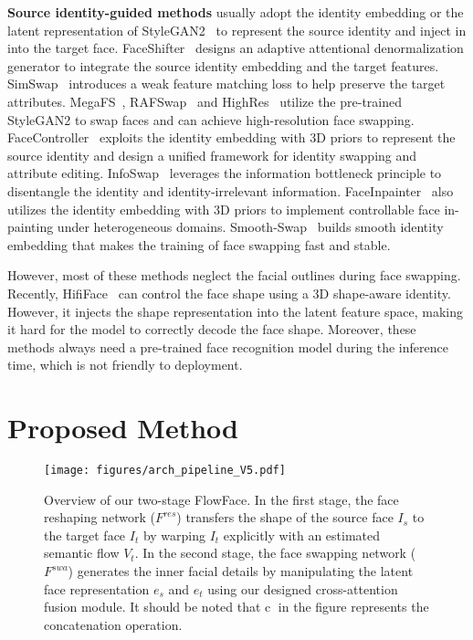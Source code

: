 \textbf{Source identity-guided methods} usually adopt the identity embedding or the latent representation of StyleGAN2~\cite{karras2020analyzing} to represent the source identity and inject in into the target face. FaceShifter~\cite{li2019faceshifter} designs an adaptive attentional denormalization generator to integrate the source identity embedding and the target features. SimSwap~\cite{chen2020simswap} introduces a weak feature matching loss to help preserve the target attributes.  MegaFS~\cite{zhu2021one}, RAFSwap~\cite{xu2022region} and HighRes~\cite{xu2022high} utilize the pre-trained StyleGAN2 to swap faces and can achieve high-resolution face swapping.   FaceController~\cite{xu2021facecontroller} exploits the identity embedding with 3D priors to represent the source identity and design a unified framework for identity swapping and attribute editing. InfoSwap~\cite{gao2021information} leverages the information bottleneck principle to disentangle the identity and identity-irrelevant information. FaceInpainter~\cite{li2021faceinpainter} also utilizes the identity embedding with 3D priors to implement controllable face in-painting under heterogeneous domains. Smooth-Swap~\cite{kim2022smooth} builds smooth identity embedding that makes the training of face swapping fast and stable.
 
However, most of these methods neglect the facial outlines during face swapping. Recently, HifiFace~\cite{wang2021hififace} can control the face shape using a 3D shape-aware identity. However, it injects the shape representation into the latent feature space, making it hard for the model to correctly decode the face shape.
Moreover, these methods always need a pre-trained face recognition model during the inference time, which is not friendly to deployment.

\section{Proposed Method}

\begin{figure*}[t]
\centering
\texttt{[image: figures/arch\_pipeline\_V5.pdf]}  
\caption{Overview of our two-stage FlowFace. In the first stage, the face reshaping network ($F^{res}$) transfers the shape of the source face $I_s$ to the target face $I_t$ by warping $I_t$ explicitly with an estimated semantic flow $V_t$. In the second stage, the face swapping network ($F^{swa}$) generates the inner facial details by manipulating the latent face representation $e_s$ and $e_t$ using our designed cross-attention fusion module. It should be noted that \textcircled{c} in the figure represents the concatenation operation.}
\label{fig:arch}
\end{figure*}


